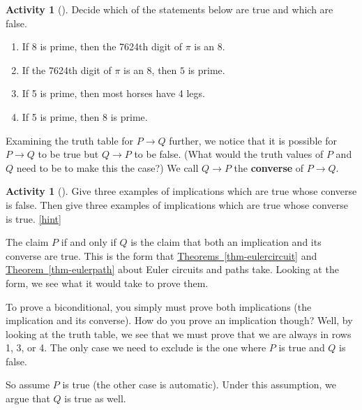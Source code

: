\documentclass[10pt,]{book}
\newcommand{\terminology}[1]{\textbf{#1}}
\theoremstyle{plain}
\theoremstyle{definition}
\theoremstyle{definition}
\theoremstyle{definition}
\newtheorem{activity}[project]{Activity}
\numberwithin{equation}{chapter}
\def\imp{\rightarrow}
\begin{document}
\begin{activity}[]\label{activity-7}
\hypertarget{p-161}{}%
Decide which of the statements below are true and which are false.%
\begin{enumerate}[font=\bfseries,label=(\alph*),ref=\alph*]
\item\label{task-9} \hypertarget{p-162}{}%
If 8 is prime, then the 7624th digit of \(\pi\) is an 8.%
\item\label{task-10} \hypertarget{p-163}{}%
If the 7624th digit of \(\pi\) is an 8, then \(5\) is prime.%
\item\label{task-11} \hypertarget{p-164}{}%
If 5 is prime, then most horses have 4 legs.%
\item\label{task-12} \hypertarget{p-165}{}%
If 5 is prime, then 8 is prime.%
\end{enumerate}
\end{activity}
\hypertarget{p-166}{}%
Examining the truth table for \(P \imp Q\) further, we notice that it is possible for \(P \imp Q\) to be true but \(Q \imp P\) to be false. (What would the truth values of \(P\) and \(Q\) need to be to make this the case?) We call \(Q \imp P\) the \terminology{converse} of \(P \imp Q\).%
\begin{activity}[]\label{activity-8}
\hypertarget{p-167}{}%
Give three examples of implications which are true whose converse is false.  Then give three examples of implications which are true whose converse is true.%
\hfill{\tiny\hyperlink{a-13}{[hint]}\hypertarget{q-13}{}}\end{activity}
\hypertarget{p-169}{}%
The claim \(P\) if and only if \(Q\) is the claim that both an implication and its converse are true.  This is the form that \hyperref[thm-eulercircuit]{Theorems~\ref{thm-eulercircuit}} and \hyperref[thm-eulerpath]{Theorem~\ref{thm-eulerpath}} about Euler circuits and paths take.  Looking at the form, we see what it would take to prove them.%
\par
\hypertarget{p-170}{}%
To prove a biconditional, you simply must prove both implications (the implication and its converse).  How do you prove an implication though?  Well, by looking at the truth table, we see that we must prove that we are always in rows 1, 3, or 4.  The only case we need to exclude is the one where \(P\) is true and \(Q\) is false.%
\par
\hypertarget{p-171}{}%
So assume \(P\) is true (the other case is automatic).  Under this assumption, we argue that \(Q\) is true as well.%
\par
\hypertarget{p-172}{}%
\end{document}
